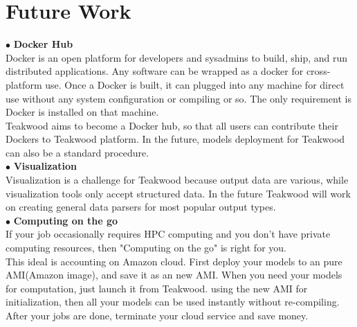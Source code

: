 \chapter{Future Work}

$\bullet$ \textbf{Docker Hub}\\

Docker is an open platform for developers and sysadmins to build, ship, and run distributed applications. Any software can be wrapped as a docker for cross-platform use. Once a Docker is built, it can plugged into any machine for direct use without any system configuration or compiling or so. The only requirement is Docker is installed on that machine.\\
Teakwood aims to become a Docker hub, so that all users can contribute their Dockers to Teakwood platform. In the future, models deployment for Teakwood can also be a standard procedure.\\

$\bullet$ \textbf{Visualization}\\

Visualization is a challenge for Teakwood because output data are various, while visualization tools only accept structured data. In the future Teakwood will work on creating general data parsers for most popular output types.\\

$\bullet$ \textbf{Computing on the go}\\

If your job occasionally requires HPC computing and you don't have private computing resources, then "Computing on the go" is right for you.\\
This ideal is accounting on Amazon cloud. First deploy your models to an pure AMI(Amazon image), and save it as an new AMI. When you need your models for computation, just launch it from Teakwood. using the new AMI for initialization, then all your models can be used instantly without re-compiling. After your jobs are done, terminate your cloud service and save money. 